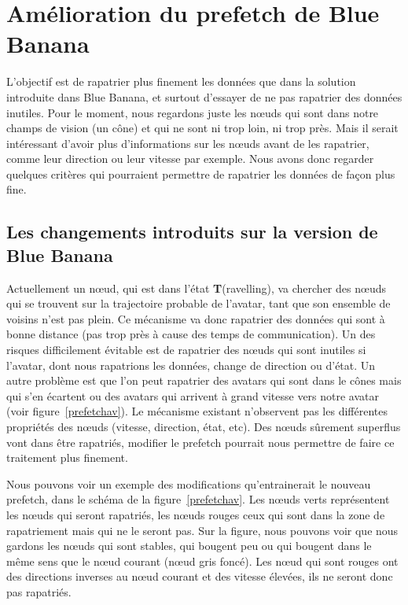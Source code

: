 \section{Amélioration du prefetch de Blue Banana}

L'objectif  est de rapatrier plus finement les données que dans la solution introduite dans Blue Banana, et surtout d'essayer de ne pas rapatrier des données inutiles. Pour le moment, nous regardons juste les nœuds qui sont dans notre champs de vision (un cône) et qui ne sont ni trop loin, ni trop près. Mais il serait intéressant d'avoir plus d'informations sur les nœuds avant de les rapatrier, comme leur direction ou leur vitesse par exemple. Nous avons donc regarder quelques critères qui pourraient permettre de rapatrier les données de façon plus fine.

\subsection{Les changements introduits sur la version de Blue Banana}


\par Actuellement un nœud, qui est dans l'état \textbf{T}(ravelling), va chercher des nœuds qui se trouvent sur la trajectoire probable de l'avatar, tant que son ensemble de voisins n'est pas plein. Ce mécanisme va donc rapatrier des données qui sont à bonne distance (pas trop près à cause des temps de communication). Un des risques difficilement évitable est de rapatrier des nœuds qui sont inutiles si l'avatar, dont nous rapatrions les données, change de direction ou d'état. Un autre problème est que l'on peut rapatrier des avatars qui sont dans le cônes mais qui s'en écartent ou des avatars qui arrivent à grand vitesse vers notre avatar (voir figure~\ref{prefetchav}). Le mécanisme existant n'observent pas les différentes propriétés des nœuds (vitesse, direction, état, etc). Des nœuds sûrement superflus vont dans être rapatriés, modifier le prefetch pourrait nous permettre de faire ce traitement plus finement.

\par  Nous pouvons voir un exemple des modifications qu'entrainerait le nouveau prefetch, dans le schéma de la figure~\ref{prefetchav}. Les nœuds verts représentent les nœuds qui seront rapatriés, les nœuds rouges ceux qui sont dans la zone de rapatriement mais qui ne le seront pas. Sur la figure, nous pouvons voir que nous gardons les nœuds qui sont stables, qui bougent peu ou qui bougent dans le même sens que le nœud courant (nœud gris foncé). Les nœud qui sont rouges ont des directions inverses au nœud courant et des vitesse élevées, ils ne seront donc pas rapatriés.

